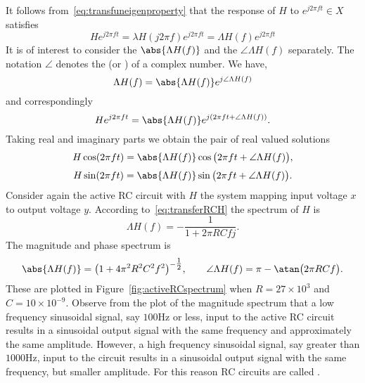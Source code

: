 It follows from~\eqref{eq:transfuneigenproperty} that the response of $H$ to $e^{j2\pi ft} \in X$ satisfies
\[
H e^{j 2\pi f t}  = \lambda H (j 2\pi f) e^{j 2\pi f t} = \Lambda H(f) e^{j 2\pi f t}
\]
It is of interest to consider the  $\abs{\Lambda H(f)}$ and the  $\angle{\Lambda H(f)}$ separately.  The notation $\angle$ denotes the  (or ) of a complex number.  We have,
\[
\Lambda H(f) = \abs{\Lambda H(f)} e^{j \angle{\Lambda H(f)}}
\]  
and correspondingly
\[
H e^{j 2\pi f t} = \abs{\Lambda H(f)} e^{j ( 2\pi f t + \angle{\Lambda H(f)})}.
\]
Taking real and imaginary parts we obtain the pair of real valued solutions
\[
H\cos(2\pi f t) = \abs{\Lambda H (f)} \cos\big(2\pi f t + \angle{\Lambda H(f)}\big),
\]
\begin{equation}\label{eq:spectrumrealvaluedsinsolution}
H \sin(2\pi f t)  = \abs{\Lambda H(f)} \sin\big(2\pi f t + \angle{\Lambda H(f)}\big).
\end{equation}
Consider again the active RC circuit with $H$ the system mapping input voltage $x$ to output voltage $y$.  According to~\eqref{eq:transferRCH} the spectrum of $H$ is
\begin{equation}\label{eq:specactiveRC}
\Lambda H(f) = -\frac{1}{1 + 2 \pi RC f j}.
\end{equation}
The magnitude and phase spectrum is
\[
\abs{\Lambda H(f)} = \big(1 + 4\pi^2 R^2 C^2 f^2\big)^{-\tfrac{1}{2}}, \qquad \angle \Lambda H(f) = \pi - \atan\big( 2\pi R C f \big).
\]
These are plotted in Figure~\ref{fig:activeRCspectrum} when $R=27 \times 10^3$ and $C= 10 \times 10^{-9}$.  Observe from the plot of the magnitude spectrum that a low frequency sinusoidal signal, say $100\si{\hertz}$ or less, input to the active RC circuit results in a sinusoidal output signal with the same frequency and approximately the same amplitude.  However, a high frequency sinusoidal signal, say greater than $1000\si{\hertz}$, input to the circuit results in a sinusoidal output signal with the same frequency, but smaller amplitude.  For this reason RC circuits are called .

